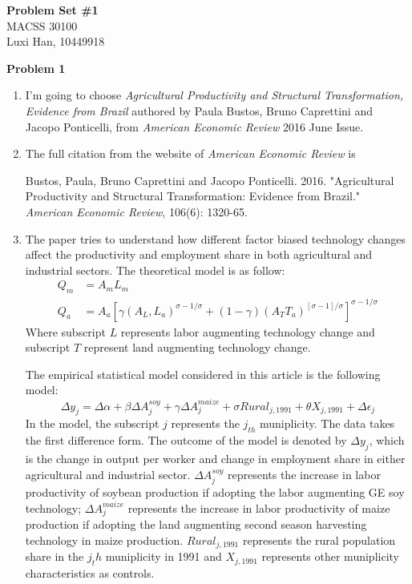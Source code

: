 \documentclass[letterpaper,12pt]{article}
\theoremstyle{definition}
\numberwithin{equation}{section}
\begin{document}
\begin{flushleft}
   \textbf{\Large{Problem Set \#1}} \\
   MACSS 30100 \\
   Luxi Han, 10449918\\
\end{flushleft}

\noindent \textbf{\large Problem 1}\par

\begin{enumerate}  [\bfseries (a)]
	\item I'm going to choose \textit{Agricultural Productivity and Structural Transformation, Evidence from Brazil} authored by Paula Bustos, Bruno Caprettini and Jacopo Ponticelli, from \textit{American Economic Review} 2016 June Issue.\par
	\item The full citation from the website of \textit{American Economic Review} is \par
	Bustos, Paula, Bruno Caprettini and Jacopo Ponticelli. 2016. "Agricultural Productivity and Structural Transformation: Evidence from Brazil." \textit{American Economic Review}, 106(6): 1320-65.\par
	\item The paper tries to understand how different factor biased technology changes affect the productivity and employment share in both agricultural and industrial sectors.  The theoretical model is as follow: \\
	\begin{align} 
	Q_m &= A_m L_m \\
	Q_a &= A_a [\gamma(A_L, L_a)^{{\sigma - 1}/\sigma} + (1 - \gamma)(A_T T_a)^{[\sigma - 1]/ \sigma}]^{{\sigma - 1} / \sigma}
	\end{align} 
	Where subscript \(L\) represents labor augmenting technology change and subscript \(T\) represent land augmenting technology change.	\par
	The empirical statistical model considered in this article is the following model:\\
	\begin{equation}
	\Delta y_j = \Delta \alpha + \beta \Delta A_j ^ {soy} + \gamma \Delta A_j ^{maize} + \sigma Rural _{j, 1991} + \theta X_{j, 1991} + \Delta \epsilon _j
	\end{equation}
	In the model, the subscript \(j\) represents the \(j_{th}\) muniplicity. The data takes the first difference form. The outcome of the model is denoted by \(\Delta y_j\), which is the change in output per worker and change in employment share in either agricultural and industrial sector. \(\Delta A_j ^{soy}\) represents the increase in labor productivity of soybean production if adopting the labor augmenting GE soy technology; \(\Delta A_j ^{maize}\) represents the increase in labor productivity of maize production if adopting the land augmenting second season harvesting technology in maize production. \(Rural_{j, 1991}\) represents the rural population share in the \(j_th\) muniplicity in 1991 and \(X_{j, 1991}\) represents other muniplicity characteristics as controls.\par
	

\end{enumerate}
\end{document}
